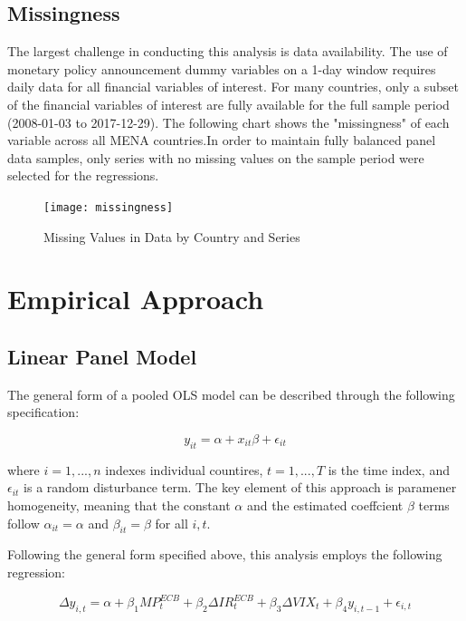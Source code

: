 \documentclass[a4paper]{article}
\begin{document}
\subsection{Missingness}

The largest challenge in conducting this analysis is data availability. The use of monetary policy announcement dummy variables on a 1-day window requires daily data for all financial variables of interest. For many countries, only a subset of the financial variables of interest are fully available for the full sample period (2008-01-03 to 2017-12-29). The following chart shows the "missingness" of each variable across all MENA countries.In order to maintain fully balanced panel data samples, only series with no missing values on the sample period were selected for the regressions.

\begin{figure}[H]
	\centering
	\texttt{[image: missingness]}
	\caption{Missing Values in Data by Country and Series}
	\label{figure:missingness} 
\end{figure}



	
\section{Empirical Approach}

\subsection{Linear Panel Model}

The general form of a pooled OLS model can be described through the following specification:

$$y_{it} = \alpha + x_{it}\beta + \epsilon_{it}$$

where $i=1,...,n$ indexes individual countires, $t=1,...,T$ is the time index, and $\epsilon_{it}$ is a random disturbance term. The key element of this approach is paramener homogeneity, meaning that the constant $\alpha$ and the estimated coeffcient $\beta$ terms follow $\alpha_{it} = \alpha$ and $\beta_{it} = \beta$ for all $i,t$. 

Following the general form specified above, this analysis employs the following regression: 

$$\Delta y_{i,t} = \alpha + \beta_1 MP^{ECB}_t + \beta_2 \Delta IR^{ECB}_t + \beta_3 \Delta VIX_t + \beta_4 y_{i,t-1} + \epsilon_{i,t}$$
\end{document}
